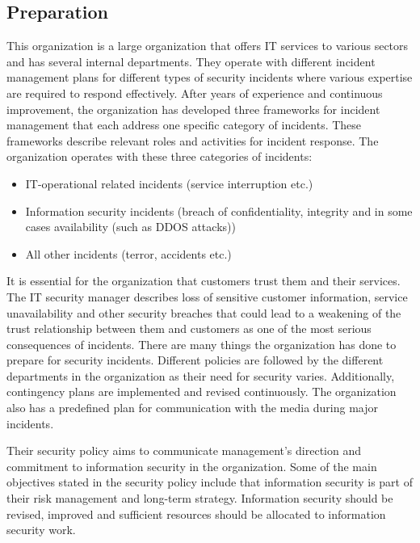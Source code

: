\subsection{Preparation}
This organization is a large organization that offers IT services to various sectors and has several internal departments. They operate with different incident management plans for different types of security incidents where various expertise are required to respond effectively.  
After years of experience and continuous improvement, the organization has developed three frameworks for incident management that each address one specific category of incidents. These frameworks describe relevant roles and activities for incident response. The organization operates with these three categories of incidents:
\begin{itemize}
\item IT-operational related incidents (service interruption etc.)
\item Information security incidents (breach of confidentiality, integrity and in some cases availability (such as DDOS attacks))
\item All other incidents (terror, accidents etc.)
\end{itemize}
 
It is essential for the organization that customers trust them and their services. The IT security manager describes loss of sensitive customer information, service unavailability and other security breaches that could lead to a weakening of the trust relationship between them and customers as one of the most serious consequences of incidents. 
There are many things the organization has done to prepare for security incidents. Different policies are followed by the different departments in the organization as their need for security varies. Additionally, contingency plans are implemented and revised continuously. The organization also has a predefined plan for communication with the media during major incidents. 

Their security policy aims to communicate management's direction and commitment to information security in the organization. Some of the main objectives stated in the security policy include that information security is part of their risk management and long-term strategy. Information security should be revised, improved and sufficient resources should be allocated to information security work.

